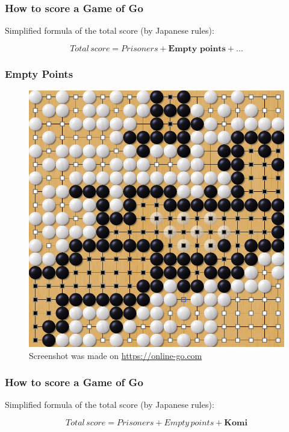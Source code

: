 \documentclass{beamer}
\begin{document}
\begin{frame}
\frametitle{How to score a Game of Go}

Simplified formula of the total score (by Japanese rules):

\[Total\, score = Prisoners + \textbf{Empty points} + ...\]

\end{frame}

\begin{frame}
\frametitle{Empty Points}

\begin{figure}
	\centering
	\includegraphics[scale=0.33]{images/scoring_territory}
	\caption*{Screenshot was made on \url{https://online-go.com}}
\end{figure}

\end{frame}

\begin{frame}
\frametitle{How to score a Game of Go}

Simplified formula of the total score (by Japanese rules):

\[Total\, score = Prisoners + Empty \, points + \textbf{Komi} \]

\end{frame}
\end{document}
